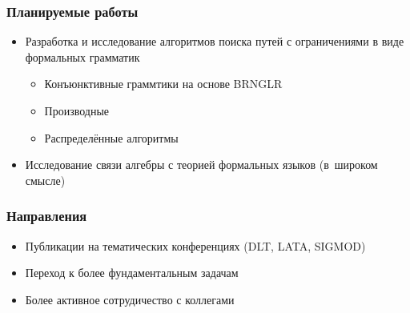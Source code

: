 \documentclass[xcolor=table]{beamer}
\begin{document}
\begin{frame}[fragile]
  \transwipe[direction=90]
  \frametitle{Планируемые работы}
\begin{itemize}
      \item Разработка и исследование алгоритмов поиска путей с ограничениями в виде формальных грамматик
      \begin{itemize}
        \item Конъюнктивные граммтики на основе BRNGLR
        \item Производные
        \item Распределённые алгоритмы
      \end{itemize}
      \item Исследование связи алгебры с теорией формальных языков (в~широком смысле) 
\end{itemize}
\end{frame}

\begin{frame}[fragile]
  \transwipe[direction=90]
  \frametitle{Направления}
\begin{itemize}
      \item Публикации на тематических конференциях (DLT, LATA, SIGMOD)
      \item Переход к более фундаментальным задачам
      \item Более активное сотрудичество с коллегами
\end{itemize}
\end{frame}
\end{document}
